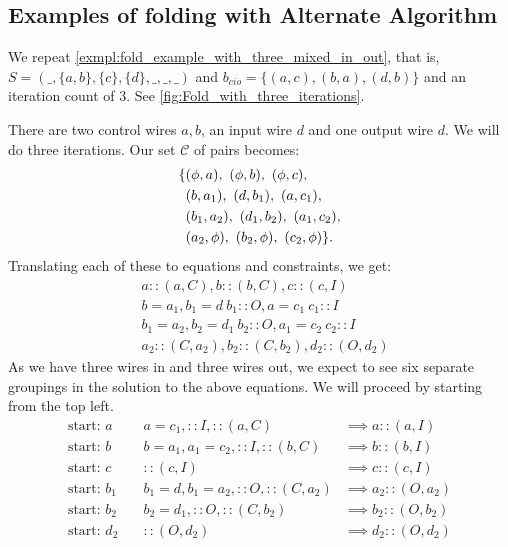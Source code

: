 \subsection{Examples of folding with Alternate Algorithm} %
\label{sub:examples_of_folding_with_alternate_algorithm}
\begin{example}\label{exmpl:alternate_fold_example_with_three_mixed_in_out}
  We repeat \vref{exmpl:fold_example_with_three_mixed_in_out}, that is,
  $S=(\_,\{a,b\},\{c\},\{d\},\_,\_,\_)$ and $b_{cio}=\{(a,c),(b,a),(d,b)\}$
  and an iteration count of $3$. See 
  \vref{fig:Fold_with_three_iterations}.
\end{example}
There are two control wires $a,b$, an input wire $d$ and one output
wire $d$. We  will do three iterations. Our set $\mathcal{C}$ of pairs
becomes:
\begin{align*}
  \{ & (\phi,a),\ (\phi,b),\ (\phi,c),\\
  & (b,a_1),\ (d,b_1),\ (a,c_1),\\
  & (b_1,a_2),\ (d_1,b_2),\ (a_1,c_2),\\
  & (a_2,\phi),\ (b_2,\phi),\ (c_2,\phi)\}.\\
\end{align*}
Translating each of these to equations and constraints, we get:
\begin{align*}
  &a::(a,C), b::(b,C), c::(c,I)\\
  &b=a_1, b_1=d\ b_1::O, a=c_1\ c_1::I\\
  &b_1=a_2, b_2=d_1\ b_2::O, a_1=c_2\ c_2::I\\
  &a_2::(C,a_2), b_2::(C,b_2), d_2::(O,d_2)
\end{align*}
As we have three wires in and three wires out, we expect to see six separate
groupings in the solution to the above equations. We will proceed by starting
from the top left.
\begin{align*}
  \text{start: }a &\quad a=c_1, ::I, ::(a,C) &\implies a::(a,I)\\
  \text{start: }b &\quad  b=a_1,a_1=c_2, ::I, ::(b,C) &\implies b::(b,I)\\
  \text{start: }c &\quad  ::(c,I) &\implies c::(c,I)\\
  \text{start: }b_1 &\quad  b_1=d, b_1=a_2, ::O, ::(C,a_2) &\implies
    a_2::(O,a_2)\\
  \text{start: }b_2 &\quad  b_2=d_1, ::O, ::(C,b_2) &\implies b_2::(O,b_2)\\
  \text{start: }d_2 &\quad  ::(O,d_2) &\implies d_2::(O,d_2)
\end{align*}


